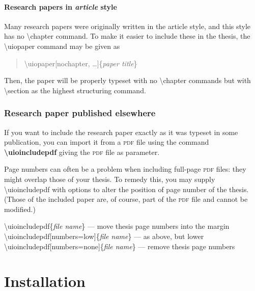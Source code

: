 \documentclass[UKenglish, thumbmarks]{uiophdthesis}
\newcommand{\bsl}{\textbackslash}
\newcommand{\p}[1]{\textsf{#1}}
\newcommand{\pcmd}[1]{\p{\bsl #1}}
\newcommand{\ppar}[1]{\p{\{#1\}}}
\begin{document}
\subsubsection{Research papers in \emph{article} style\label{article-style}}
Many research papers were originally written in the \p{article} style,
and this style has no \pcmd{chapter} command. To make it easier to include
these in the thesis, the \pcmd{uiopaper} command may be given as
\begin{quote}
  \p{\pcmd{uiopaper}[nochapter, \dots]\ppar{\emph{paper title}}}
\end{quote}
Then, the paper will be properly typeset with no \pcmd{chapter}
commands but with \pcmd{section} as the highest structuring command.

\subsection{Research paper published elsewhere}
If you want to include the research paper exactly as it was typeset in
some publication, you can import it from a \textsc{pdf} file using the
command \textbf{\pcmd{uioincludepdf}} giving the \textsc{pdf} file as
parameter.

Page numbers can often be a problem when including full-page
\textsc{pdf} files: they might overlap those of your thesis. To remedy
this, you may supply \pcmd{uioincludepdf} with options to alter the
position of page number of the thesis. (Those of the included paper are, of
course, part of the \textsc{pdf} file and cannot be modified.)

\medskip\noindent
\p{\pcmd{uioincludepdf}\ppar{\emph{file name}}} --- move thesis
  page numbers into the margin\\
\p{\pcmd{uioincludepdf}[numbers=low]\ppar{\emph{file name}}} --- as
  above, but lower\\
\p{\pcmd{uioincludepdf}[numbers=none]\ppar{\emph{file name}}} ---
  remove thesis page numbers

  
\chapter{Installation}
\end{document}
